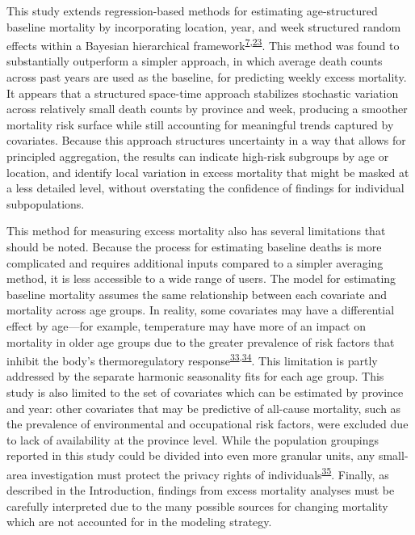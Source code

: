 \documentclass[
]{article}
\begin{document}
This study extends regression-based methods for estimating age-structured baseline mortality by incorporating location, year, and week structured random effects within a Bayesian hierarchical framework\textsuperscript{\protect\hyperlink{ref-Serfling1963}{7},\protect\hyperlink{ref-Ederer1961}{23}}⁠. This method was found to substantially outperform a simpler approach, in which average death counts across past years are used as the baseline, for predicting weekly excess mortality. It appears that a structured space-time approach stabilizes stochastic variation across relatively small death counts by province and week, producing a smoother mortality risk surface while still accounting for meaningful trends captured by covariates. Because this approach structures uncertainty in a way that allows for principled aggregation, the results can indicate high-risk subgroups by age or location, and identify local variation in excess mortality that might be masked at a less detailed level, without overstating the confidence of findings for individual subpopulations.

This method for measuring excess mortality also has several limitations that should be noted. Because the process for estimating baseline deaths is more complicated and requires additional inputs compared to a simpler averaging method, it is less accessible to a wide range of users. The model for estimating baseline mortality assumes the same relationship between each covariate and mortality across age groups. In reality, some covariates may have a differential effect by age---for example, temperature may have more of an impact on mortality in older age groups due to the greater prevalence of risk factors that inhibit the body's thermoregulatory response\textsuperscript{\protect\hyperlink{ref-Yu2010}{33},\protect\hyperlink{ref-Stafoggia2008}{34}}⁠. This limitation is partly addressed by the separate harmonic seasonality fits for each age group. This study is also limited to the set of covariates which can be estimated by province and year: other covariates that may be predictive of all-cause mortality, such as the prevalence of environmental and occupational risk factors, were excluded due to lack of availability at the province level. While the population groupings reported in this study could be divided into even more granular units, any small-area investigation must protect the privacy rights of individuals\textsuperscript{\protect\hyperlink{ref-Bayer2000}{35}}⁠. Finally, as described in the Introduction, findings from excess mortality analyses must be carefully interpreted due to the many possible sources for changing mortality which are not accounted for in the modeling strategy.
\end{document}
